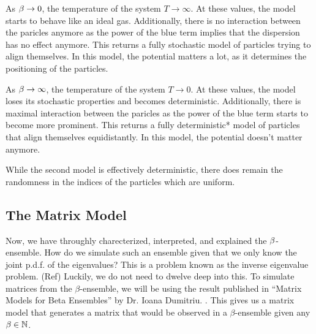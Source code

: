 As $\beta \to 0$, the temperature of the system $T \to \infty$.
At these values, the model starts to behave like an ideal gas.
Additionally, there is no interaction between the paricles anymore as the power of the blue term implies that the dispersion has no effect anymore. This returns a fully stochastic
model of particles trying to align themselves. In this model, the potential matters a lot, as it determines the positioning of the particles.

\bigskip

 As $\beta \to \infty$, the temperature of the system $T \to 0$.
At these values, the model loses its stochastic properties and becomes deterministic.
Additionally, there is maximal interaction between the paricles as the power of the blue term starts to become more prominent. This returns a fully deterministic*
model of particles that align themselves equidistantly. In this model, the potential doesn't matter anymore.

\medskip

\begin{remark}
While the second model is effectively deterministic, there does remain the randomness in the indices of the particles which are uniform.
\end{remark}




\newpage
\subsection{The Matrix Model}

Now, we have throughly charecterized, interpreted, and explained the $\beta$-ensemble. How do we simulate such an ensemble given that we only know the joint p.d.f. of the eigenvalues?
This is a problem known as the inverse eigenvalue problem. (Ref) Luckily, we do not need to dwelve deep into this. To simulate matrices from the $\beta$-ensemble, we will be using the result published in ``Matrix Models for Beta Ensembles'' by Dr. Ioana Dumitriu. \cite{dumitriu}. This gives us a matrix model that generates a matrix that would be observed in a $\beta$-ensemble given any $\beta \in \mathbb{N}$.

